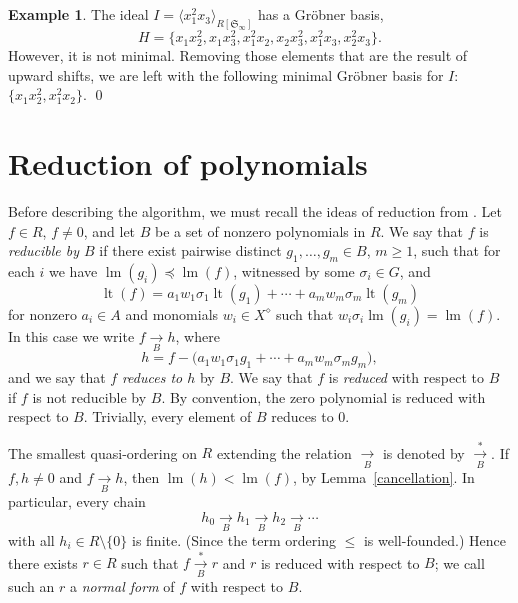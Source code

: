 \documentclass{amsart}
\theoremstyle{definition}
\newtheorem{example}[theorem]{Example}
\theoremstyle{remark}
\numberwithin{equation}{section}
\newcommand{\lm}{\operatorname{lm}}
\newcommand{\lt}{\operatorname{lt}}
\newcommand{\<}{\langle}
\renewcommand{\>}{\rangle}
\begin{document}
\begin{example}\label{surpriseGBex}
The ideal $I = \<x_1^2 x_3^{\phantom{3}}\>_{R[{\mathfrak S}_\infty]}$ has a Gr\"obner
basis, \[H = \{x_1^{\phantom{3}} x_2^2, x_1^{\phantom{3}} x_3^2, x_1^2 x_2^{\phantom{3}}, 
x_2^{\phantom{3}} x_3^2, x_1^2 x_3^{\phantom{3}},x_2^2 x_3^{\phantom{3}}\}.\] 
However, it is not minimal.  Removing those elements that are the result 
of upward shifts, we are left with the following minimal Gr\"obner basis for $I$:  
$\{x_1^{\phantom{3}} x_2^2, x_1^2x_2^{\phantom{3}}\}$. 
\qed
\end{example}


\section{Reduction of polynomials}\label{descriptionalgorithm}

Before describing the algorithm, we must recall the ideas of reduction from
\cite{AH}.  Let $f\in R$, $f\neq 0$, and let $B$ be a set of nonzero polynomials
in $R$. We say that $f$ is \emph{reducible by $B$}\/ if there exist
pairwise distinct $g_1,\dots,g_m\in B$, $m\geq 1$, such that for each
$i$ we have $\lm(g_i)\preceq \lm(f)$, witnessed by some $\sigma_i\in
G$, and
$$\lt(f) = a_1w_1\sigma_1\lt(g_1) + \cdots + a_mw_m\sigma_m\lt(g_m)$$
for nonzero $a_i\in A$ and monomials $w_i\in X^\diamond$ such that
$w_i\sigma_i\lm(g_i)=\lm(f)$.  In this case we write
$f\underset{B}\longrightarrow h$, where
$$h=f - \big(a_1w_1\sigma_1g_1 + \cdots + a_mw_m\sigma_mg_m\big),$$
and we say that $f$ \emph{reduces to $h$} by $B$.  We say that $f$ is
\emph{reduced} with respect to $B$ if $f$ is not reducible by $B$. By
convention, the zero polynomial is reduced with respect to $B$.
Trivially, every element of $B$ reduces to $0$.




The smallest quasi-ordering on $R$ extending the relation
$\underset{B}\longrightarrow$ is denoted by
$\underset{B}{\overset{*}\longrightarrow}$.  If $f,h\neq 0$ and
$f\underset{B}\longrightarrow h$, then $\lm(h)<\lm(f)$, by
Lemma~\ref{cancellation}.  In particular, every chain
$$h_0\underset{B}\longrightarrow h_1\underset{B}\longrightarrow h_2
\underset{B}\longrightarrow \cdots$$
with all $h_i\in R\setminus\{0\}$
is finite. (Since the term ordering $\leq$ is well-founded.) Hence
there exists $r\in R$ such that
$f\underset{B}{\overset{*}\longrightarrow} r$ and $r$ is reduced with
respect to $B$; we call such an $r$ a \emph{normal form} of $f$ with
respect to $B$.
\end{document}
